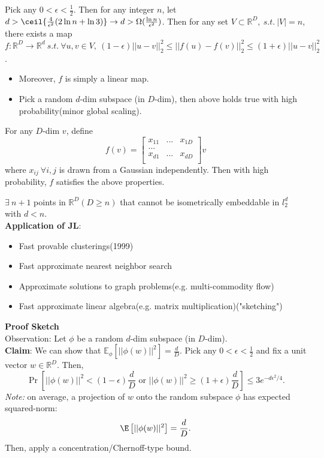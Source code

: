 \begin{theorem}
Pick any $0<\epsilon<\frac{1}{2}$. Then for any integer $n$, let $d >
\ceil{\frac{4}{\epsilon^2} (2\ln n + \ln 3)} \rightarrow d > \Omega
(\frac{\ln n}{\epsilon^2})$. Then for any set $V \subset \mathbb{R}^D,
\ s.t. \ |V|=n$, there exists a map $f:\mathbb{R}^D \rightarrow
\mathbb{R}^d \ s.t. \ \forall u,v \in V, \ (1-\epsilon)||u-v||^2_2
\leq ||f(u)-f(v)||_2^2 \leq (1+\epsilon)||u-v||^2_2$.\\ 
\begin{itemize} 
\item Moreover, $f$ is simply a linear map.  
\item Pick a random $d$-dim subspace (in $D$-dim), then above holds 
  true with high probability(minor global scaling).  
\end{itemize} 
\end{theorem} 
For any $D$-dim $v$, define \[
f(v)=
\begin{bmatrix}
    x_{11}&...&x_{1D}\\
    ...\\
    x_{d1}&...&x_{dD}\\
\end{bmatrix}v
\]
where $x_{ij}\ \forall i,j$ is drawn from a Gaussian
independently. Then with high probability, $f$ satisfies the above
properties. 

$\exists \ n+1$ points in $\mathbb{R}^D (D\geq n)$ that cannot be
isometrically embeddable in $l_2^d$ with $d<n$.\\ 
\textbf{Application of JL}:
\begin{itemize}
\item Fast provable clusterings(1999)
\item Fast approximate nearest neighbor search
\item Approximate solutions to graph problems(e.g. multi-commodity
  flow) 
\item Fast approximate linear algebra(e.g. matrix
  multiplication)("sketching") 
\end{itemize}
\textbf{Proof Sketch}\\
Observation: Let $\phi$ be a random $d$-dim subspace (in $D$-dim).\\
\textbf{Claim}: We can show that $\mathbb{E}_\phi[||\phi
  (w)||^2]=\frac{d}{D}$. Pick any $0<\epsilon<\frac{1}{2}$ and fix a
unit vector $w\in \mathbb{R}^D$. Then,  
\[
\Pr\left[||\phi (w)||^2 < (1-\epsilon) \frac{d}{D} \textrm{ or }
  ||\phi (w)||^2 \geq (1+\epsilon) \frac{d}{D}\right] \leq
3e^{-d\epsilon^2/4}. 
\]
\emph{Note:} on average, a projection of $w$ onto the random subspace
$\phi$ has expected squared-norm: 
\[\E\left[||\phi(w)||^2\right] = \frac{d}{D}.\]
Then, apply a concentration/Chernoff-type bound.

